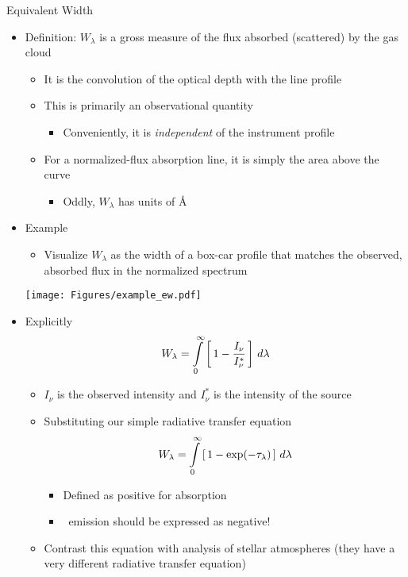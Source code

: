 \documentclass[12pt,letterpaper]{article}
\begin{document}
\begin{Aenumerate}
{\bf \item Equivalent Width}
 \begin{itemize}
  \item Definition: $W_\lambda$ is a gross measure of the 
	flux absorbed (scattered) by the gas cloud
	\begin{itemize}
	\item It is the convolution of the optical depth with the line profile
	\item This is primarily an observational quantity
		\begin{itemize}
		\item Conveniently, it is {\it independent} of the instrument profile
		\end{itemize}
	\item For a normalized-flux absorption line, it is 
            simply the area above the curve
		\begin{itemize}
		\item Oddly, $W_\lambda$ has units of \AA
		\end{itemize}
	\end{itemize}

  \item Example
	\begin{itemize}
	\item Visualize $W_\lambda$ as the width of a box-car profile
	that matches the observed, absorbed flux in the normalized spectrum
	\end{itemize}

	\texttt{[image: Figures/example\_ew.pdf]}

  \item Explicitly
	\begin{equation}
	W_\lambda = \int\limits_0^\infty \left [ \, 1 - \frac{I_\nu}{I_\nu^*} \, \right ] \, d\lambda
	\end{equation}
	\begin{itemize}
	\item $I_\nu$ is the observed intensity and $I_\nu^*$ is the intensity of
	the source
	\item Substituting our simple radiative transfer equation 
	\begin{equation}
	W_\lambda = \int\limits_0^\infty \left [ \, 1 - \exp(-\tau_\lambda) \, \right ] \, d\lambda
	\end{equation}
		\begin{itemize}
		\item Defined as positive for absorption
		\item \lya\ emission should be expressed as negative! 
		\end{itemize}
	\item Contrast this equation with analysis of stellar atmospheres (they have
	a very different radiative transfer equation)
	\end{itemize}


\end{itemize}
\end{Aenumerate}
\end{document}
